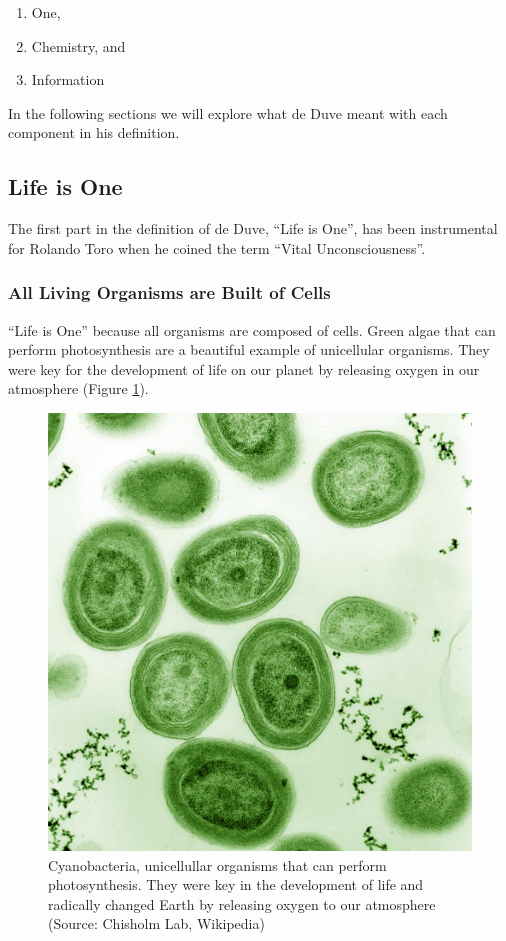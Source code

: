 \documentclass[
  11pt,
]{book}
\providecommand{\tightlist}{%
  \setlength{\itemsep}{0pt}\setlength{\parskip}{0pt}}
\begin{document}
\begin{enumerate}
\def\labelenumi{\arabic{enumi}.}
\tightlist
\item
  One,
\item
  Chemistry, and
\item
  Information
\end{enumerate}

In the following sections we will explore what de Duve meant with each component in his definition.

\hypertarget{life-is-one}{%
\subsection{Life is One}\label{life-is-one}}

The first part in the definition of de Duve, ``Life is One'', has been instrumental for Rolando Toro when he coined the term ``Vital Unconsciousness''.

\hypertarget{all-living-organisms-are-built-of-cells}{%
\subsubsection{All Living Organisms are Built of Cells}\label{all-living-organisms-are-built-of-cells}}

``Life is One'' because all organisms are composed of cells.
Green algae that can perform photosynthesis are a beautiful example of unicellular organisms. They were key for the development of life on our planet by releasing oxygen in our atmosphere (Figure \ref{fig:greenAlgae}).

\begin{figure}

{\centering \includegraphics[width=0.3\linewidth]{./figs/Prochlorococcus_marinus} 

}

\caption{Cyanobacteria, unicellullar organisms that can perform photosynthesis. They were key in the development of life and radically changed Earth by releasing oxygen to our atmosphere (Source: Chisholm Lab, Wikipedia)}\label{fig:greenAlgae}
\end{figure}
\end{document}

